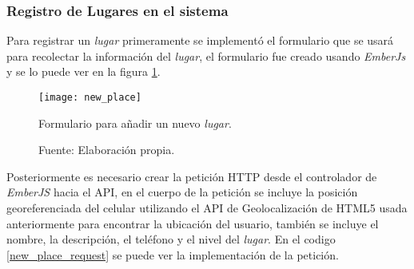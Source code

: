 
\subsubsection{Registro de Lugares en el sistema}

Para registrar un \emph{lugar} primeramente se implementó el formulario que se usará para recolectar la información del \emph{lugar}, el formulario fue creado usando \emph{EmberJs} y se lo puede ver en la figura \ref{fig:new_place}. \\

\begin{figure}[H]
     \begin{center}
       \texttt{[image: new\_place]}

       \caption{Formulario para añadir un nuevo \emph{lugar}.}
       \label{fig:new_place}
       \caption*{Fuente: Elaboración propia.}
     \end{center}
\end{figure}

Posteriormente es necesario crear la petición HTTP desde el controlador de \emph{EmberJS} hacia el API, en el cuerpo de la petición se incluye la posición georeferenciada del celular utilizando el API de Geolocalización de HTML5 usada anteriormente para encontrar la ubicación del usuario, también se incluye el nombre, la descripción, el teléfono y el nivel del \emph{lugar}. En el codigo \ref{new_place_request} se puede ver la implementación de la petición.



